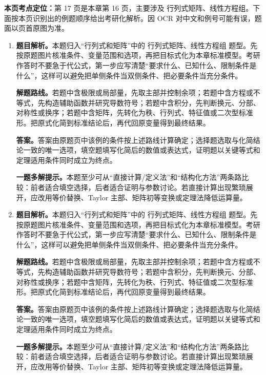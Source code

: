 \begin{solutionblock}
\textbf{本页考点定位：}第 17 页是本章第 16 页，主要涉及 行列式矩阵、线性方程组。下面按本页识别出的例题顺序给出考研化解析。因 OCR 对中文和例号可能有误，题面以页首原图为准。

\begin{enumerate}[label=\textbf{例\arabic*.}, leftmargin=2.4em]

\item \textbf{题目解析。}本题归入“行列式和矩阵”中的 行列式矩阵、线性方程组 题型。先按原题图片核准条件、变量范围和选项，再把目标式化为本章标准模型。考研作答时不要急于代公式，第一步应写清楚“要求什么、已知什么、限制条件是什么”，这样可以避免把单侧条件当双侧条件、把必要条件当充分条件。

\textbf{解题路线。}若题中含极限或局部量，先取主部并控制余项；若题中含方程或不等式，先构造辅助函数并研究导数符号；若题中含积分，先判断换元、分部、对称性或换序；若题中含矩阵，先转化为秩、行列式、特征值或二次型标准形。把原式化简到标准结论后，再代回原变量得到最终结果。

\textbf{答案。}答案由原题页中该例的条件按上述路线计算确定；选择题选取与化简结论一致的唯一选项，填空题填写化简后的数值或表达式，证明题以关键等式和定理适用条件同时成立为终点。

\textbf{一题多解提示。}本题至少可从“直接计算/定义法”和“结构化方法”两条路比较：前者适合填空选择，后者适合证明与参数讨论。若直接计算出现繁琐展开，应改用等价替换、Taylor 主部、矩阵初等变换或定理法降低运算量。

\item \textbf{题目解析。}本题归入“行列式和矩阵”中的 行列式矩阵、线性方程组 题型。先按原题图片核准条件、变量范围和选项，再把目标式化为本章标准模型。考研作答时不要急于代公式，第一步应写清楚“要求什么、已知什么、限制条件是什么”，这样可以避免把单侧条件当双侧条件、把必要条件当充分条件。

\textbf{解题路线。}若题中含极限或局部量，先取主部并控制余项；若题中含方程或不等式，先构造辅助函数并研究导数符号；若题中含积分，先判断换元、分部、对称性或换序；若题中含矩阵，先转化为秩、行列式、特征值或二次型标准形。把原式化简到标准结论后，再代回原变量得到最终结果。

\textbf{答案。}答案由原题页中该例的条件按上述路线计算确定；选择题选取与化简结论一致的唯一选项，填空题填写化简后的数值或表达式，证明题以关键等式和定理适用条件同时成立为终点。

\textbf{一题多解提示。}本题至少可从“直接计算/定义法”和“结构化方法”两条路比较：前者适合填空选择，后者适合证明与参数讨论。若直接计算出现繁琐展开，应改用等价替换、Taylor 主部、矩阵初等变换或定理法降低运算量。

\end{enumerate}
\end{solutionblock}



